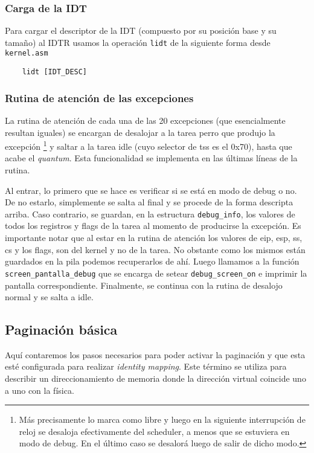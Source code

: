 \subsubsection{Carga de la IDT}
Para cargar el descriptor de la IDT (compuesto por su posición base y su tamaño) al IDTR usamos la operación \texttt{lidt} de la siguiente forma desde \texttt{kernel.asm}
\begin{lstlisting}
	lidt [IDT_DESC]
\end{lstlisting}

\subsubsection{Rutina de atención de las excepciones}
\label{subsubsection:rutinas-excepciones}
La rutina de atención de cada una de las 20 excepciones (que esencialmente resultan iguales) se encargan de desalojar a la tarea perro que produjo la excepción \footnote{Más precisamente lo marca como libre y luego en la siguiente interrupción de reloj se desaloja efectivamente del scheduler, a menos que se estuviera en modo de debug. En el último caso se desalorá luego de salir de dicho modo.} y saltar a la tarea idle (cuyo selector de tss es el 0x70), hasta que acabe el \emph{quantum}. Esta funcionalidad se implementa en las últimas líneas de la rutina.

Al entrar, lo primero que se hace es verificar si se está en modo de debug o no. De no estarlo, simplemente se salta al final y se procede de la forma descripta arriba. Caso contrario, se guardan, en la estructura \texttt{debug\_info},  los valores de todos los registros y flags de la tarea al momento de producirse la excepción. Es importante notar que al estar en la rutina de atención los valores de eip, esp, ss, cs y los flags, son del kernel y no de la tarea. No obstante como los mismos están guardados en la pila podemos recuperarlos de ahí. Luego llamamos a la función \texttt{screen\_pantalla\_debug} que se encarga de setear \texttt{debug\_screen\_on} e imprimir la pantalla correspondiente. Finalmente, se continua con la rutina de desalojo normal y se salta a idle.


\subsection{Paginación básica}

Aquí contaremos los pasos necesarios para poder activar la paginación y que esta
esté configurada para realizar \textit{identity mapping}. Este término se
utiliza para describir un direccionamiento de memoria donde la dirección virtual
coincide uno a uno con la física.

